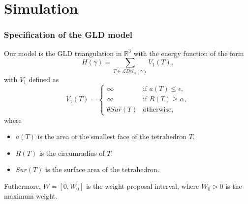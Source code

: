 \documentclass[c, 10pt]{beamer}
\begin{document}
\section{Simulation}
\framesection{}




\begin{frame}\frametitle{Specification of the GLD model}
Our model is the GLD triangulation in $\mathbb R^3$ with  the energy function of the form
$$H(\gamma)= \sum_{T \in \mathcal LDel_\Lambda(\gamma)} V_1(T),$$ 
with $V_1$ defined as
\begin{equation}
V_1(T) = 
\left\{
    \begin{array}{ll}
        \infty & \mbox{if } a(T)\leq \epsilon, \\
        \infty & \mbox{if } R(T)\geq \alpha, \\
        \theta Sur(T) & \mbox{otherwise, }
    \end{array}
\right. 
\end{equation}
where
\begin{itemize}
\item $a(T)$ is the area of the smallest face of the tetrahedron $T$.
\item $R(T)$ is the circumradius of $T$.
\item $Sur(T)$ is the surface area of the tetrahedron.
\end{itemize}

Futhermore, $W = [0,W_0]$ is the weight proposal interval, where $W_0>0$ is the maximum weight.

\end{frame}
\end{document}
